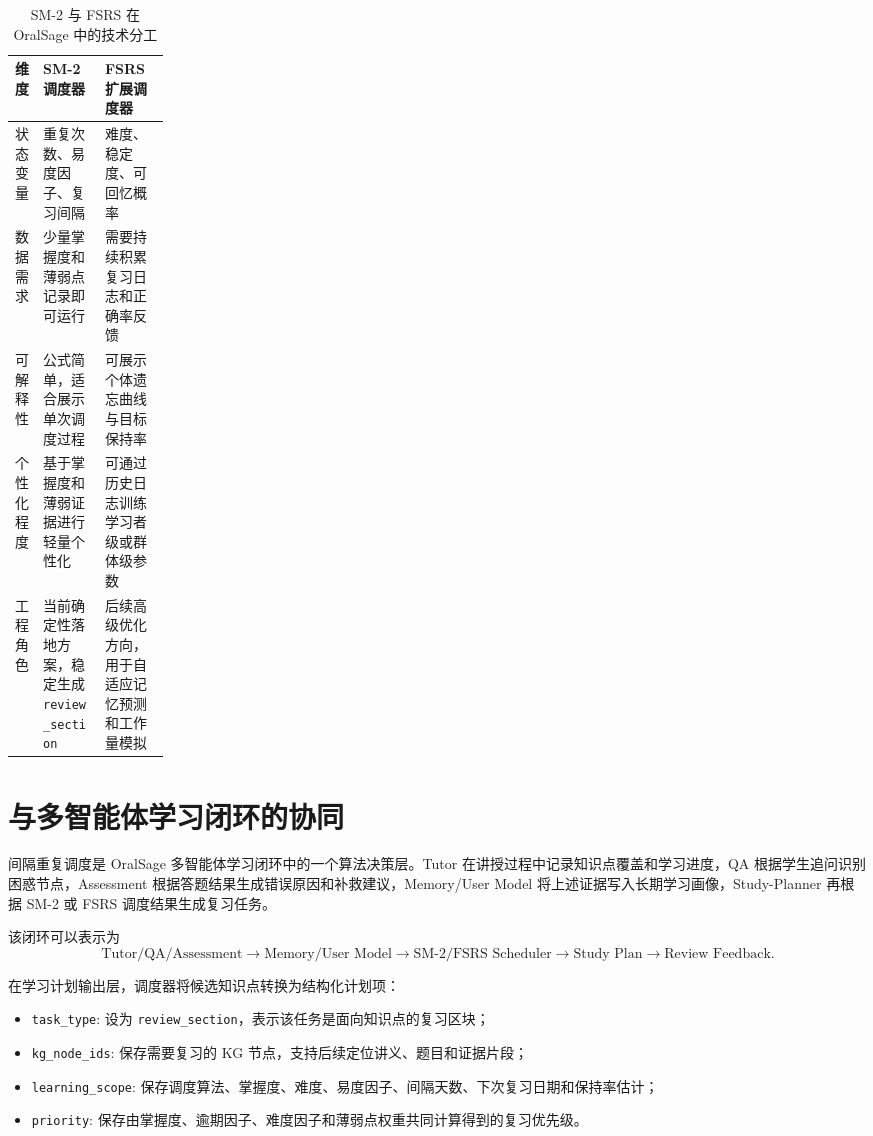 \begin{table}[H]
  \centering
  \caption{SM-2 与 FSRS 在 OralSage 中的技术分工}
  \label{tab:sm2-fsrs-comparison}
  \begin{tabularx}{\linewidth}{p{0.18\linewidth}X X}
    \toprule
    维度 & SM-2 调度器 & FSRS 扩展调度器 \\
    \midrule
    状态变量 & 重复次数、易度因子、复习间隔 & 难度、稳定度、可回忆概率 \\
    数据需求 & 少量掌握度和薄弱点记录即可运行 & 需要持续积累复习日志和正确率反馈 \\
    可解释性 & 公式简单，适合展示单次调度过程 & 可展示个体遗忘曲线与目标保持率 \\
    个性化程度 & 基于掌握度和薄弱证据进行轻量个性化 & 可通过历史日志训练学习者级或群体级参数 \\
    工程角色 & 当前确定性落地方案，稳定生成 \texttt{review\_section} & 后续高级优化方向，用于自适应记忆预测和工作量模拟 \\
    \bottomrule
  \end{tabularx}
\end{table}

\section{与多智能体学习闭环的协同}

间隔重复调度是 OralSage 多智能体学习闭环中的一个算法决策层。Tutor 在讲授过程中记录知识点覆盖和学习进度，QA 根据学生追问识别困惑节点，Assessment 根据答题结果生成错误原因和补救建议，Memory/User Model 将上述证据写入长期学习画像，Study-Planner 再根据 SM-2 或 FSRS 调度结果生成复习任务。

该闭环可以表示为
\[
\text{Tutor/QA/Assessment}
\rightarrow
\text{Memory/User Model}
\rightarrow
\text{SM-2/FSRS Scheduler}
\rightarrow
\text{Study Plan}
\rightarrow
\text{Review Feedback}.
\]

在学习计划输出层，调度器将候选知识点转换为结构化计划项：
\begin{itemize}
  \item \texttt{task\_type}: 设为 \texttt{review\_section}，表示该任务是面向知识点的复习区块；
  \item \texttt{kg\_node\_ids}: 保存需要复习的 KG 节点，支持后续定位讲义、题目和证据片段；
  \item \texttt{learning\_scope}: 保存调度算法、掌握度、难度、易度因子、间隔天数、下次复习日期和保持率估计；
  \item \texttt{priority}: 保存由掌握度、逾期因子、难度因子和薄弱点权重共同计算得到的复习优先级。
\end{itemize}

